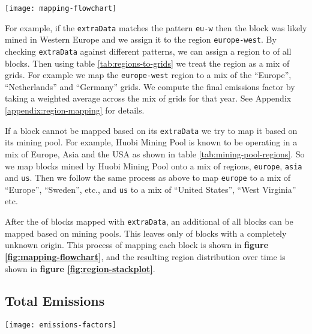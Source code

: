 \begin{figure*}[htp]
    \centering
    \texttt{[image: mapping-flowchart]}
    \caption{Process for mapping a block to an emissions factor.}
    \label{fig:mapping-flowchart}
\end{figure*}

For example, if the \texttt{extraData} matches the pattern \texttt{eu-w} then the block was likely mined in Western Europe and we assign it to the region \texttt{europe-west}. By checking \texttt{extraData} against  different patterns, we can assign a region to  of all blocks. Then using table \ref{tab:regions-to-grids} we treat the region as a mix of grids. For example we map the \texttt{europe-west} region to a mix of the ``Europe'', ``Netherlands'' and ``Germany'' grids. We compute the final emissions factor by taking a weighted average across the mix of grids for that year. See Appendix \ref{appendix:region-mapping} for details.

If a block cannot be mapped based on its \texttt{extraData} we try to map it based on its mining pool. For example, Huobi Mining Pool is known to be operating in a mix of Europe, Asia and the USA as shown in table \ref{tab:mining-pool-regions}. So we map blocks mined by Huobi Mining Pool onto a mix of regions, \texttt{europe}, \texttt{asia} and \texttt{us}. Then we follow the same process as above to map \texttt{europe} to a mix of ``Europe'', ``Sweden'', etc., and \texttt{us} to a mix of ``United States'', ``West Virginia'' etc.

After the  of blocks mapped with \texttt{extraData}, an additional  of all blocks can be mapped based on  mining pools. This leaves only  of blocks with a completely unknown origin. This process of mapping each block is shown in \textbf{figure \ref{fig:mapping-flowchart}}, and the resulting region distribution over time is shown in \textbf{figure \ref{fig:region-stackplot}}.

\subsection{Total Emissions}

\begin{figure*}[htp]
    \centering
    \texttt{[image: emissions-factors]}
    \caption{Ethereum electricity emissions factor \ef{}, using data from regional emissions factors weighted by region estimated from block metadata.}
    \label{fig:emissions-factors}
\end{figure*}

